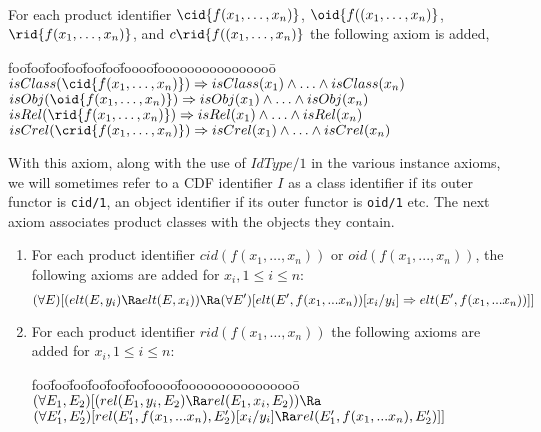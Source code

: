 \begin{axiom} \label{ax:downcl}
\ \\
For each product identifier $\cid{f(x_1,\ldots,x_n)}$,
$\oid{f((x_1,\ldots,x_n)}$, $\rid{f(x_1,\ldots,x_n)}$, and
$c\rid{f((x_1,\ldots,x_n)}$ the following axiom is added,
\begin{tabbing}
foo\=foo\=foo\=foo\=foo\=foo\=foooo\=foooooooooooooooo\=\kill
\> $isClass(\cid{f(x_1,\ldots,x_n)}) \Rightarrow 
	isClass(x_1) \wedge \ldots \wedge isClass(x_n) $\\
\> $isObj(\oid{f(x_1,\ldots,x_n)}) \Rightarrow 
	isObj(x_1) \wedge \ldots \wedge isObj(x_n) $\\
\> $isRel(\rid{f(x_1,\ldots,x_n)}) \Rightarrow 
	isRel(x_1) \wedge \ldots \wedge isRel(x_n) $\\
\> $isCrel(\crid{f(x_1,\ldots,x_n)}) \Rightarrow 
	isCrel(x_1) \wedge \ldots \wedge isCrel(x_n) $
\end{tabbing}
\end{axiom}

With this axiom, along with the use of $IdType/1$ in the various
instance axioms, we will sometimes refer to a CDF identifier $I$ as a
class identifier if its outer functor is {\tt cid/1}, an object
identifier if its outer functor is {\tt oid/1} etc.  The next axiom
associates product classes with the objects they contain.

\begin{axiom} \label{ax:implsc}

\begin{enumerate}
\item For each product identifier $cid(f(x_1,\ldots,x_n))$ or 
$oid(f(x_1,...,x_n))$, the following axioms are added for $x_i, 1 \leq i
\leq n$:
\[
(\forall E) [(elt(E,y_i) \Ra elt(E,x_i)) \Ra \\
	(\forall E') [elt(E',f(x_1,...x_n))[x_i/y_i] \Rightarrow elt(E',f(x_1,...x_n))]]
\]

\item For each product identifier $rid(f(x_1,\ldots,x_n))$ the
following axioms are added for $x_i, 1 \leq i 
\leq n$:
\begin{tabbing}
foo\=foo\=foo\=foo\=foo\=foo\=foooo\=foooooooooooooooo\=\kill
\> $(\forall E_1,E_2) [(rel(E_1,y_i,E_2) \Ra rel(E_1,x_i,E_2)) \Ra$ \\
\> \> $(\forall E'_1,E'_2) [rel(E'_1,f(x_1,...x_n),E'_2)[x_i/y_i] \Ra rel(E'_1,f(x_1,...x_n),E'_2)]]$
\end{tabbing}
\end{enumerate}
\end{axiom}


